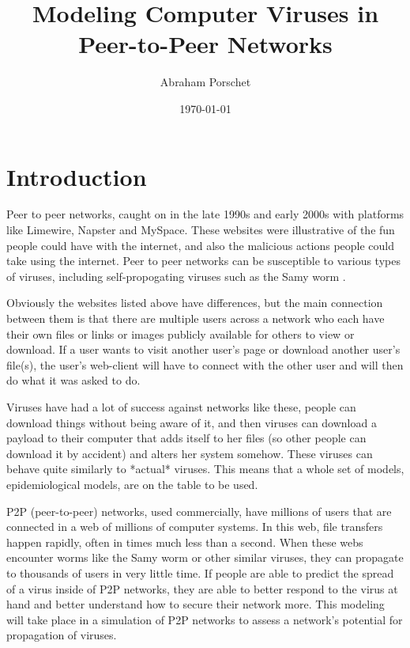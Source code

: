 \documentclass[12pt, oneside]{article}
\title{Modeling Computer Viruses in Peer-to-Peer Networks}
\author{Abraham Porschet}
\date{\today}
\begin{document}
    \maketitle

    \section{Introduction}
        Peer to peer networks, caught on in the late 1990s and early 2000s with platforms like Limewire, Napster and MySpace. These websites
        were illustrative of the fun people could have with the internet, and also the malicious actions people could take using the internet.
        Peer to peer networks can be susceptible to various types of viruses, including self-propogating viruses such as the Samy worm \cite{VICE_2015}.\newline
        
        Obviously the websites listed above have differences, but the main connection between them is that there are multiple users across a network
        who each have their own files or links or images publicly available for others to view or download. If a user wants to visit another user's 
        page or download another user's file(s), the user's web-client will have to connect with the other user and will then do what it was asked to do.\newline

        Viruses have had a lot of success against networks like these, people can download things without being aware of it, and then viruses can download a payload to their 
        computer that adds itself to her files (so other people can download it by accident) and alters her system somehow. These viruses can behave quite similarly to 
        *actual* viruses. This means that a whole set of models, epidemiological models, are on the table to be used.\newline
        
        P2P (peer-to-peer) networks, used commercially, have millions of users that are connected in a web of millions of computer systems.
        In this web, file transfers happen rapidly, often in times much less than a second. When these webs encounter worms like the Samy worm
        or other similar viruses, they can propagate to thousands of users in very little time. If people are able to predict the spread of
        a virus inside of P2P networks, they are able to better respond to the virus at hand and better understand how to secure their network more.
        This modeling will take place in a simulation of P2P networks to assess a network's potential for propagation of viruses.\newline
\end{document}
